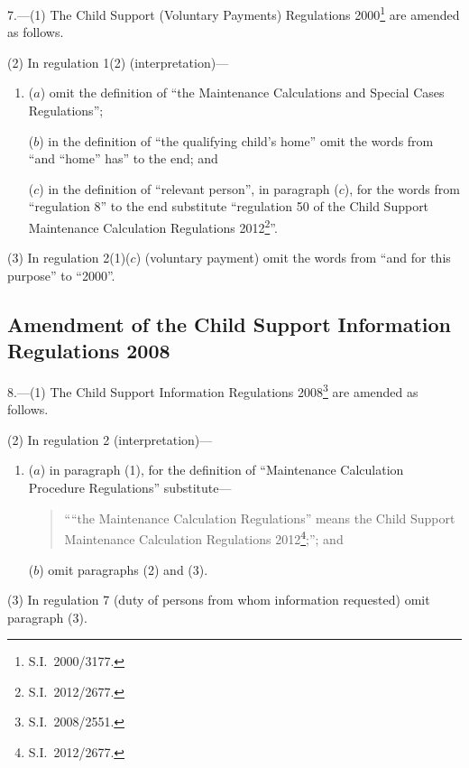 \documentclass[12pt,a4paper]{article}
\begin{document}
7.---(1)  The Child Support (Voluntary Payments) Regulations 2000\footnote{S.I.~2000/3177.} are amended as follows.

(2) In regulation 1(2) (interpretation)—
\begin{enumerate}\item[]
($a$) omit the definition of “the Maintenance Calculations and Special Cases Regulations”;

($b$) in the definition of “the qualifying child’s home” omit the words from “and “home” has” to the end; and

($c$) in the definition of “relevant person”, in paragraph ($c$), for the words from “regulation 8” to the end substitute “regulation 50 of the Child Support Maintenance Calculation Regulations 2012\footnote{S.I.~2012/2677.}”.
\end{enumerate}

(3) In regulation 2(1)($c$)  (voluntary payment) omit the words from “and for this purpose” to “2000”.

\subsection[8. Amendment of the Child Support Information Regulations 2008]{Amendment of the Child Support Information Regulations 2008}

8.---(1)  The Child Support Information Regulations 2008\footnote{S.I.~2008/2551.} are amended as follows.

(2) In regulation 2 (interpretation)—
\begin{enumerate}\item[]
($a$) in paragraph (1), for the definition of “Maintenance Calculation Procedure Regulations” substitute—
\begin{quotation}
““the Maintenance Calculation Regulations” means the Child Support Maintenance Calculation Regulations 2012\footnote{S.I.~2012/2677.};”; and
\end{quotation}

($b$) omit paragraphs (2) and (3).
\end{enumerate}

(3) In regulation 7 (duty of persons from whom information requested) omit paragraph (3).
\end{document}
